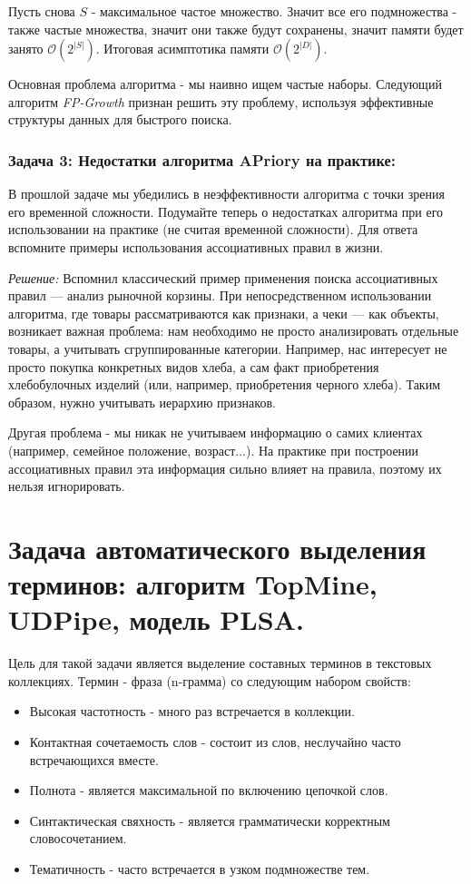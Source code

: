 Пусть снова \(S\) - максимальное частое множество. Значит все его подмножества - также частые множества, значит они также будут сохранены, значит памяти будет занято \(\mathcal{O}(2^{|S|})\). Итоговая асимптотика памяти \(\mathcal{O}(2^{|D|})\).

Основная проблема алгоритма - мы наивно ищем частые наборы. Следующий алгоритм \textit{FP-Growth} признан решить эту проблему, используя эффективные структуры данных для быстрого поиска.

\subsubsection{Задача 3: Недостатки алгоритма APriory на практике:} В прошлой задаче мы убедились в неэффективности алгоритма с точки зрения его временной сложности. Подумайте теперь о недостатках алгоритма при его использовании на практике (не считая временной сложности). Для ответа вспомните примеры использования ассоциативных правил в жизни.

\textit{Решение:} Вспомнил классический пример применения поиска ассоциативных правил — анализ рыночной корзины. При непосредственном использовании алгоритма, где товары рассматриваются как признаки, а чеки — как объекты, возникает важная проблема: нам необходимо не просто анализировать отдельные товары, а учитывать сгруппированные категории. Например, нас интересует не просто покупка конкретных видов хлеба, а сам факт приобретения хлебобулочных изделий (или, например, приобретения черного хлеба). Таким образом, нужно учитывать иерархию признаков.

Другая проблема - мы никак не учитываем информацию о самих клиентах (например, семейное положение, возраст\(\ldots\)). На практике при построении ассоциативных правил эта информация сильно влияет на правила, поэтому их нельзя игнорировать.

\section{Задача автоматического выделения терминов: алгоритм TopMine, UDPipe, модель PLSA.}

Цель для такой задачи является выделение составных терминов в текстовых коллекциях. Термин - фраза (n-грамма) со следующим набором свойств:

\begin{itemize}
	\item Высокая частотность - много раз встречается в коллекции.
	\item Контактная сочетаемость слов - состоит из слов, неслучайно часто встречающихся вместе.
	\item Полнота - является максимальной по включению цепочкой слов.
	\item Синтактическая свяхность - является грамматически корректным словосочетанием.
	\item Тематичность - часто встречается в узком подмножестве тем.
\end{itemize}


